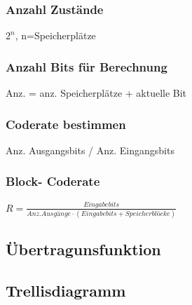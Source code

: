 \subsubsection{Anzahl Zustände}
$2^n$, n=Speicherplätze

\subsubsection{Anzahl Bits für Berechnung}
Anz. = anz. Speicherplätze + aktuelle Bit

\subsubsection{Coderate bestimmen}
Anz. Ausgangsbits / Anz. Eingangsbits

\subsubsection{Block- Coderate}
$R=\frac{Eingabebits}{Anz. Ausgänge \cdot(Eingabebits + Speicherblöcke)}$





\subsection{Übertragunsfunktion}
\subsection{Trellisdiagramm}
